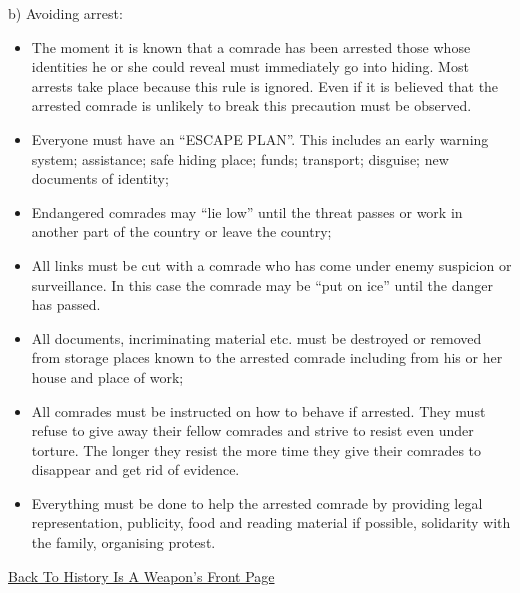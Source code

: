 b) Avoiding arrest:

\begin{itemize}
\tightlist
\item
  The moment it is known that a comrade has been arrested those whose
  identities he or she could reveal must immediately go into hiding.
  Most arrests take place because this rule is ignored. Even if it is
  believed that the arrested comrade is unlikely to break this
  precaution must be observed.
\item
  Everyone must have an ``ESCAPE PLAN''. This includes an early warning
  system; assistance; safe hiding place; funds; transport; disguise; new
  documents of identity;
\item
  Endangered comrades may ``lie low'' until the threat passes or work in
  another part of the country or leave the country;
\item
  All links must be cut with a comrade who has come under enemy
  suspicion or surveillance. In this case the comrade may be ``put on
  ice'' until the danger has passed.
\item
  All documents, incriminating material etc. must be destroyed or
  removed from storage places known to the arrested comrade including
  from his or her house and place of work;
\item
  All comrades must be instructed on how to behave if arrested. They
  must refuse to give away their fellow comrades and strive to resist
  even under torture. The longer they resist the more time they give
  their comrades to disappear and get rid of evidence.
\item
  Everything must be done to help the arrested comrade by providing
  legal representation, publicity, food and reading material if
  possible, solidarity with the family, organising protest.
\end{itemize}

\href{/indextrue.html}{Back To History Is A Weapon's Front Page}

\begin{longtable}[c]{@{}l@{}}
\toprule
\begin{minipage}[t]{0.97\columnwidth}\raggedright\strut
\strut\end{minipage}\tabularnewline
\bottomrule
\end{longtable}

